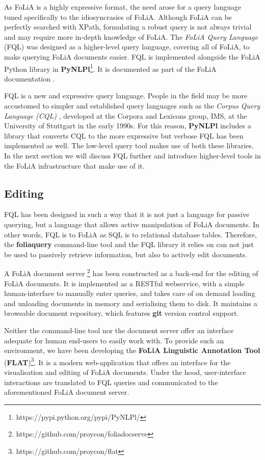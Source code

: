 \documentclass[a4paper,11pt]{article}
\begin{document}
As FoLiA is a highly expressive format, the need arose for a query language
tuned specifically to the idiosyncrasies of FoLiA. Although FoLiA can be
perfectly searched with XPath, formulating a robust query is not always trivial
and may require more in-depth knowledge of FoLiA. The \emph{FoLiA Query
Language} (FQL) was designed as a higher-level query language, covering all of
FoLiA, to make querying FoLiA documents easier. FQL is implemented alongside
the FoLiA Python library in
\textbf{PyNLPl}\footnote{https://pypi.python.org/pypi/PyNLPl/}. It is documented as part
of the FoLiA documentation \cite{FOLIADOC2014}.

FQL is a new and expressive query language. People in the field may be more
accustomed to simpler and established query languages such as the \emph{Corpus
Query Language (CQL)} \cite{CQL}, developed at the Corpora and Lexicons group,
IMS, at the University of Stuttgart in the early 1990s. For this reason,
\textbf{PyNLPl} includes a library that converts CQL to the more expressive but
verbose FQL has been implemented as well. The low-level query tool makes use of
both these libraries. In the next section we will discuss FQL further and
introduce higher-level tools in the FoLiA infrastructure that make use of it.

\subsection{Editing}

FQL has been designed in such a way that it is not just a language for passive
querying, but a language that allows active manipulation of FoLiA documents. In
other words, FQL is to FoLiA as SQL is to relational database tables.
Therefore, the \textbf{foliaquery} command-line tool and the FQL library it relies on
can not just be used to passively retrieve information, but also to actively
edit documents.

A FoLiA document server \footnote{https://github.com/proycon/foliadocserve} has
been constructed as a back-end for the editing of FoLiA documents. It is
implemented as a RESTful webservice, with a simple human-interface to manually
enter queries, and takes care of on demand loading and unloading documents in
memory and serialising them to disk. It maintains a browsable document
repository, which features \textbf{git} version control support.

Neither the command-line tool nor the document server offer an
interface adequate for human end-users to easily work with. To provide
such an environment, we have been developing the \textbf{FoLiA Linguistic Annotation Tool}
(\textbf{FLAT})\footnote{https://github.com/proycon/flat}. It is a modern
web-application that offers an interface for the visualisation and editing of
FoLiA documents. Under the hood, user-interface interactions are translated to FQL
queries and communicated to the aforementioned FoLiA document server.
\end{document}
